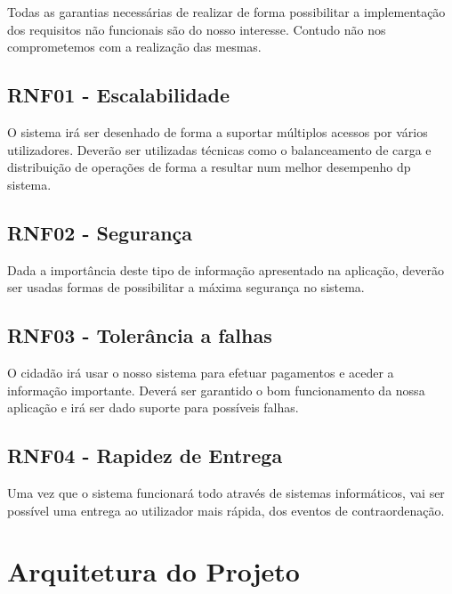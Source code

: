 \documentclass{article}
\begin{document}
Todas as garantias necessárias de realizar de forma possibilitar a
implementação dos requisitos não funcionais são do nosso interesse.
Contudo não nos comprometemos com a realização das mesmas.

\hypertarget{_rnf01_escalabilidade}{%
\subsection{RNF01 - Escalabilidade}\label{_rnf01_escalabilidade}}

O sistema irá ser desenhado de forma a suportar múltiplos acessos por
vários utilizadores. Deverão ser utilizadas técnicas como o
balanceamento de carga e distribuição de operações de forma a resultar
num melhor desempenho dp sistema.

\hypertarget{_rnf02_seguran_a}{%
\subsection{RNF02 - Segurança}\label{_rnf02_seguran_a}}

Dada a importância deste tipo de informação apresentado na aplicação,
deverão ser usadas formas de possibilitar a máxima segurança no sistema.

\hypertarget{_rnf03_toler_ncia_a_falhas}{%
\subsection{RNF03 - Tolerância a
falhas}\label{_rnf03_toler_ncia_a_falhas}}

O cidadão irá usar o nosso sistema para efetuar pagamentos e aceder a
informação importante. Deverá ser garantido o bom funcionamento da nossa
aplicação e irá ser dado suporte para possíveis falhas.

\hypertarget{_rnf04_rapidez_de_entrega}{%
\subsection{RNF04 - Rapidez de
Entrega}\label{_rnf04_rapidez_de_entrega}}

Uma vez que o sistema funcionará todo através de sistemas informáticos,
vai ser possível uma entrega ao utilizador mais rápida, dos eventos de
contraordenação.

\hypertarget{_arquitetura_do_projeto}{%
\section{Arquitetura do Projeto}\label{_arquitetura_do_projeto}}
\end{document}
